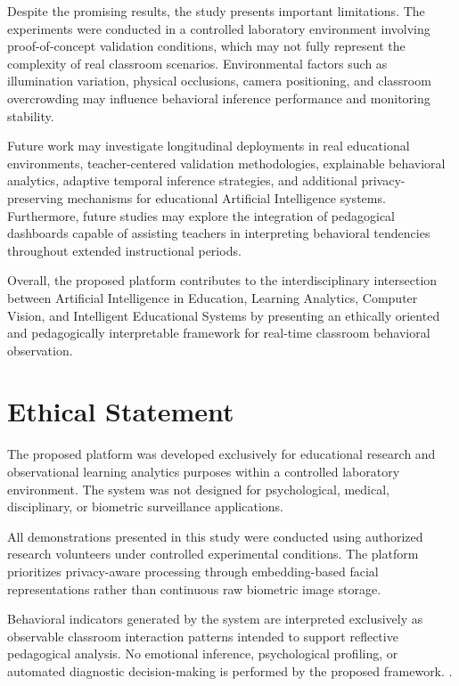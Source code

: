 \documentclass[12pt,a4paper]{article}
\begin{document}
Despite the promising results, the study presents important limitations. The experiments were conducted in a controlled laboratory environment involving proof-of-concept validation conditions, which may not fully represent the complexity of real classroom scenarios. Environmental factors such as illumination variation, physical occlusions, camera positioning, and classroom overcrowding may influence behavioral inference performance and monitoring stability.

Future work may investigate longitudinal deployments in real educational environments, teacher-centered validation methodologies, explainable behavioral analytics, adaptive temporal inference strategies, and additional privacy-preserving mechanisms for educational Artificial Intelligence systems. Furthermore, future studies may explore the integration of pedagogical dashboards capable of assisting teachers in interpreting behavioral tendencies throughout extended instructional periods.

Overall, the proposed platform contributes to the interdisciplinary intersection between Artificial Intelligence in Education, Learning Analytics, Computer Vision, and Intelligent Educational Systems by presenting an ethically oriented and pedagogically interpretable framework for real-time classroom behavioral observation.

\section*{Ethical Statement}

The proposed platform was developed exclusively for educational research and observational learning analytics purposes within a controlled laboratory environment. The system was not designed for psychological, medical, disciplinary, or biometric surveillance applications.

All demonstrations presented in this study were conducted using authorized research volunteers under controlled experimental conditions. The platform prioritizes privacy-aware processing through embedding-based facial representations rather than continuous raw biometric image storage.

Behavioral indicators generated by the system are interpreted exclusively as observable classroom interaction patterns intended to support reflective pedagogical analysis. No emotional inference, psychological profiling, or automated diagnostic decision-making is performed by the proposed framework. \cite{zhangClassroomBehaviorDetection2025,ClassroomBehaviorRecognition2025,hossenAttentionMonitoringStudents2023}.




\end{document}
